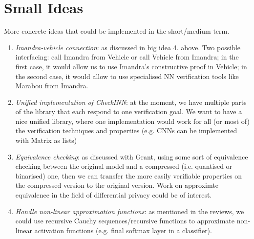 \documentclass[]{article}
\begin{document}
\section{Small Ideas}

More concrete ideas that could be implemented in the short/medium term.

	\begin{enumerate}
	\item \emph{Imandra-vehicle connection}: as discussed in big idea 4. above. Two possible interfacing: call Imandra from Vehicle or call Vehicle from Imandra; in the first case, it would allow us to use Imandra's constructive proof in Vehicle; in the second case, it would allow to use specialised NN verification tools like Marabou from Imandra.
  \item \emph{Unified implementation of CheckINN}: at the moment, we have multiple parts of the library that each respond to one verification goal. We want to have a nice unified library, where one implementation would work for all (or most of) the verification techniques and properties (e.g. CNNs can be implemented with Matrix as lists)
		\item \emph{Equivalence checking}: as discussed with Grant, using some sort of equivalence checking between the original model and a compressed (i.e. quantised or binarised) one, then we can transfer the more easily verifiable properties on the compressed version to the original version. Work on approximte equivalence in the field of differential privacy could be of interest.
		\item \emph{Handle non-linear approximation functions}: as mentioned in the reviews, we could use recursive Cauchy sequences/recursive functions to approximate non-linear activation functions (e.g. final softmax layer in a classifier).
	\end{enumerate}
\end{document}
